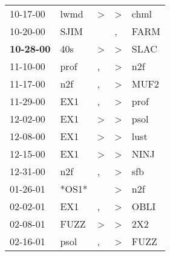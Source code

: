 \begin{supertabular}{p{0.07\textwidth}p{0.06\textwidth}p{0.02\textwidth}p{0.02\textwidth}p{0.06\textwidth}}
          10-17-00\textsuperscript{} &           lwmd\textsuperscript{} &     \textgreater &     \textgreater &           chml\textsuperscript{} \\
          10-20-00\textsuperscript{} &           SJIM\textsuperscript{} &                  &                , &           FARM\textsuperscript{} \\
 \textbf{10-28-00\textsuperscript{}} &            40s\textsuperscript{} &     \textgreater &     \textgreater &           SLAC\textsuperscript{} \\
          11-10-00\textsuperscript{} &           prof\textsuperscript{} &                , &     \textgreater &            n2f\textsuperscript{} \\
          11-17-00\textsuperscript{} &            n2f\textsuperscript{} &                , &     \textgreater &           MUF2\textsuperscript{} \\
          11-29-00\textsuperscript{} &            EX1\textsuperscript{} &                , &     \textgreater &           prof\textsuperscript{} \\
          12-02-00\textsuperscript{} &            EX1\textsuperscript{} &     \textgreater &     \textgreater &           psol\textsuperscript{} \\
          12-08-00\textsuperscript{} &            EX1\textsuperscript{} &     \textgreater &     \textgreater &           lust\textsuperscript{} \\
          12-15-00\textsuperscript{} &            EX1\textsuperscript{} &     \textgreater &     \textgreater &           NINJ\textsuperscript{} \\
          12-31-00\textsuperscript{} &            n2f\textsuperscript{} &                , &     \textgreater &            sfb\textsuperscript{} \\
          01-26-01\textsuperscript{} &                            *OS1* &                  &     \textgreater &            n2f\textsuperscript{} \\
          02-02-01\textsuperscript{} &            EX1\textsuperscript{} &                , &     \textgreater &           OBLI\textsuperscript{} \\
          02-08-01\textsuperscript{} &           FUZZ\textsuperscript{} &     \textgreater &     \textgreater &            2X2\textsuperscript{} \\
          02-16-01\textsuperscript{} &           psol\textsuperscript{} &                , &     \textgreater &           FUZZ\textsuperscript{} \\

\end{supertabular}

